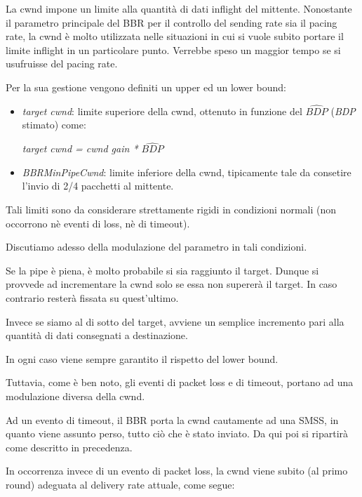 La cwnd impone un limite alla quantità di dati inflight del mittente. Nonostante il parametro principale del BBR per il controllo del sending rate sia il pacing rate, la cwnd è molto utilizzata nelle situazioni in cui si vuole subito portare il limite inflight in un particolare punto. Verrebbe speso un maggior tempo se si usufruisse del pacing rate. \bigskip

Per la sua gestione vengono definiti un upper ed un lower bound:

\begin{itemize}

\item \textit{target cwnd}: limite superiore della cwnd, ottenuto in funzione del $ \widehat{\textit{BDP}} $ (\textit{BDP} stimato) come:

\begin{center}
\textit{target cwnd = cwnd gain * $ \widehat{\textit{BDP}} $}
\end{center}

\item \textit{BBRMinPipeCwnd}: limite inferiore della cwnd, tipicamente tale da consetire l'invio di 2/4 pacchetti al mittente.

\end{itemize}

Tali limiti sono da considerare strettamente rigidi in condizioni normali (non occorrono nè eventi di loss, nè di timeout). \bigskip

Discutiamo adesso della modulazione del parametro in tali condizioni. \bigskip

Se la pipe è piena, è molto probabile si sia raggiunto il target. Dunque si provvede ad incrementare la cwnd solo se essa non supererà il target. In caso contrario resterà fissata su quest'ultimo. \bigskip 

Invece se siamo al di sotto del target, avviene un semplice incremento pari alla quantità di dati consegnati a destinazione. \bigskip

In ogni caso viene sempre garantito il rispetto del lower bound. \bigskip

Tuttavia, come è ben noto, gli eventi di packet loss e di timeout, portano ad una modulazione diversa della cwnd. \bigskip

Ad un evento di timeout, il BBR porta la cwnd cautamente ad una SMSS, in quanto viene assunto perso, tutto ciò che è stato inviato. Da qui poi si ripartirà come descritto in precedenza. \bigskip

In occorrenza invece di un evento di packet loss, la cwnd viene subito (al primo round) adeguata al delivery rate attuale, come segue:

